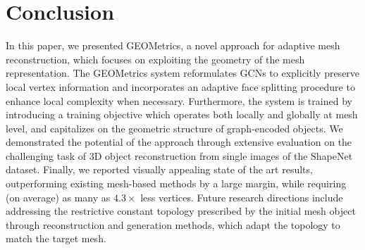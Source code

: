 \documentclass{article}
\begin{document}
\begin{table} [H]
  \caption{GEOMetrics ablation compared to full method (ours) and Pixel2Mesh. Results reported as mean F1 score on the chair class.
} 
\vspace{0.2cm}
  \centering
  \label{table:ablation}
\end{table}
\vspace{-3mm}

\section{Conclusion}

In this paper, we presented GEOMetrics, a novel approach for adaptive mesh reconstruction, which focuses on exploiting the geometry of the mesh representation. The GEOMetrics system reformulates GCNs to explicitly preserve local vertex information and incorporates an adaptive face splitting procedure to enhance local complexity when necessary. Furthermore, the system is trained by introducing a training objective which operates both locally and globally at mesh level, and capitalizes on the geometric structure of graph-encoded objects. We demonstrated the potential of the approach through extensive evaluation on the challenging task of 3D object reconstruction from single images of the ShapeNet dataset. Finally, we reported visually appealing state of the art results, outperforming existing mesh-based methods by a large margin, while requiring (on average) as many as $4.3\times$ less vertices. Future research directions include addressing the restrictive constant topology prescribed by the initial mesh object through reconstruction and generation methods, which adapt the topology to match the target mesh.
\end{document}
